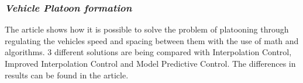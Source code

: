 \subsubsection{\textit{Vehicle Platoon formation}}
The article \cite{Tuchner2015VehicleControl} shows how it is possible to solve the problem of platooning through regulating the vehicles speed and spacing between them with the use of math and algorithms. 3 different solutions are being compared with Interpolation Control, Improved Interpolation Control and Model Predictive Control. The differences in results can be found in the article.\par
